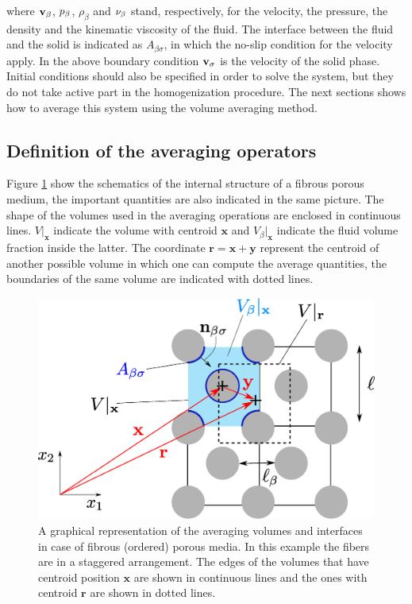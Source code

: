 \noindent where $\textbf{v}_{\beta}$, $p_{\beta}$, $\rho_{\beta}$ and $\nu_{\beta}$ stand, respectively, for  the velocity, the pressure, the density and the kinematic viscosity of the fluid.
The interface between the fluid and the solid is indicated as $A_{\beta\sigma}$, in which the no-slip condition for the velocity apply.
In the above boundary condition $\textbf{v}_{\sigma}$ is the velocity of the solid phase.
Initial conditions should also be specified in order to solve the system, but they do not take active part in the homogenization procedure.
The next sections shows how to average this system using the volume averaging method.

\subsection{Definition of the averaging operators}
Figure \ref{fig:rev} show the schematics of the internal structure of a fibrous porous medium, the important quantities are also indicated in the same picture.
The shape of the volumes used in the averaging operations are enclosed in continuous lines. $V|_{\mathbf{x}}$ indicate the volume with centroid $\mathbf{x}$ and $V_{\beta}|_{\mathbf{x}}$ indicate the fluid volume fraction inside the latter.
The coordinate $\mathbf{r} = \mathbf{x} +\mathbf{y}$ represent the centroid of another possible volume in which one can compute the average quantities, the boundaries of the same volume are indicated with dotted lines.

\begin{figure}[h!]
	\centering
	\includegraphics[width=0.7\linewidth]{chapter_2/figure/REV}
	\caption{A graphical representation of the averaging volumes and interfaces in case of fibrous (ordered) porous media. In this example the fibers are in a staggered arrangement. The edges of the volumes that have centroid position $\mathbf{x}$ are shown in continuous lines and the ones with centroid $\mathbf{r}$ are shown in dotted lines.}
	\label{fig:rev}
\end{figure}

